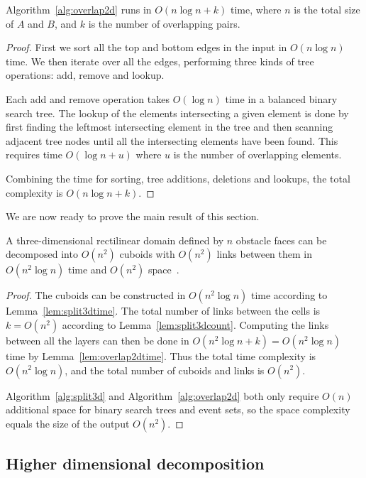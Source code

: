 \documentclass[english,gradu]{tktltiki2018}
\begin{document}
\begin{lem}\label{lem:overlap2dtime}Algorithm~\ref{alg:overlap2d} runs in $O(n\log n + k)$ time, where $n$ is the total size of $A$ and $B$, and $k$ is the number of overlapping pairs.\end{lem}
\begin{proof}
First we sort all the top and bottom edges in the input in $O(n\log n)$ time.
We then iterate over all the edges, performing three kinds of tree operations: add, remove and lookup.

Each add and remove operation takes $O(\log n)$ time in a balanced binary search tree.
The lookup of the elements intersecting a given element is done by first finding the leftmost intersecting element in the tree and then scanning adjacent tree nodes until all the intersecting elements have been found.
This requires time $O(\log n+u)$ where $u$ is the number of overlapping elements.

Combining the time for sorting, tree additions, deletions and lookups, the total complexity is $O(n\log n + k)$.
\end{proof}

We are now ready to prove the main result of this section.

\begin{theo}\label{theo:split3dtime}A three-dimensional rectilinear domain defined by $n$ obstacle faces can be decomposed into $O(n^2)$ cuboids with $O(n^2)$ links between them in $O(n^2\log n)$ time and $O(n^2)$ space~\cite{restricted}.\end{theo}
\begin{proof}
The cuboids can be constructed in $O(n^2\log n)$ time according to Lemma~\ref{lem:split3dtime}.
The total number of links between the cells is $k=O(n^2)$ according to Lemma~\ref{lem:split3dcount}.
Computing the links between all the layers can then be done in $O(n^2\log n+k)=O(n^2\log n)$ time by Lemma~\ref{lem:overlap2dtime}.
Thus the total time complexity is $O(n^2\log n)$, and the total number of cuboids and links is $O(n^2)$.

Algorithm~\ref{alg:split3d} and Algorithm~\ref{alg:overlap2d} both only require $O(n)$ additional space for binary search trees and event sets, so the space complexity equals the size of the output $O(n^2)$.
\end{proof}



\subsection{Higher dimensional decomposition}\label{sec:splitdd}
\end{document}
